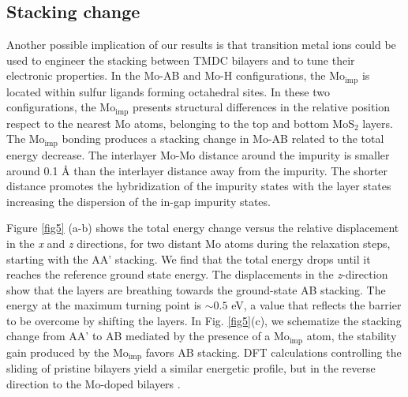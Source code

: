 \documentclass[pra,twocolumn,preprintnumbers,amsmath,amssymb]{revtex4}
\begin{document}
\subsection{Stacking change}
Another possible implication of our results is that transition metal ions could be used to engineer the stacking between TMDC bilayers and to tune their electronic properties.
%
In the Mo-AB and Mo-H configurations, the Mo$_\mathrm{imp}$ is located within sulfur ligands forming octahedral sites. In these two configurations, the Mo$_\mathrm{imp}$ presents structural differences in the relative position respect to the nearest Mo atoms, belonging to the top and bottom MoS$_{2}$ layers.
%
The Mo$_\mathrm{imp}$ bonding produces a stacking change in Mo-AB related to the total energy decrease.
The interlayer Mo-Mo distance around the impurity is smaller around 0.1 \AA{} than the interlayer distance away from the impurity.
The shorter distance promotes the hybridization of the impurity states with the layer states increasing the dispersion of the in-gap impurity states.

Figure \ref{fig5} (a-b) shows the total energy change versus the relative displacement in the \textit{x} and \textit{z} directions, for two distant Mo atoms during the relaxation steps, starting with the AA' stacking. We find that the total energy drops until it reaches the reference ground state energy.
The displacements in the \textit{z}-direction show that the layers are breathing towards the ground-state AB stacking.
The energy at the maximum turning point is $\sim 0.5$ eV, a value that reflects the barrier to be overcome by shifting the layers.
In Fig. \ref{fig5}(c), we schematize the stacking change from AA' to AB mediated by the presence of a Mo$_\mathrm{imp}$ atom, the stability gain produced by the Mo$_\mathrm{imp}$ favors AB stacking.
DFT calculations controlling the sliding of pristine bilayers yield a similar
energetic profile, but in the reverse direction to the Mo-doped bilayers \cite{peng2014stacking}.


\end{document}
